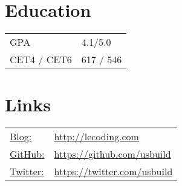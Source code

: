 \documentclass[margin]{res}
\begin{document}
\begin{resume}
\section{Education} 
\begin{tabular}{l p{3in}}
  GPA &  4.1/5.0 \\
  CET4 / CET6 & 617 / 546
\end{tabular}

\section{Links}
\begin{tabular}{l p{3in}}
  \underline{Blog:} & \href{http://lecoding.com}{http://lecoding.com}\\
  \underline{GitHub:} &  \href{https://github.com/usbuild}{https://github.com/usbuild}\\
  \underline{Twitter:} & \href{https://twitter.com/usbuild}{https://twitter.com/usbuild}
\end{tabular}

\end{resume} 
\end{document}
